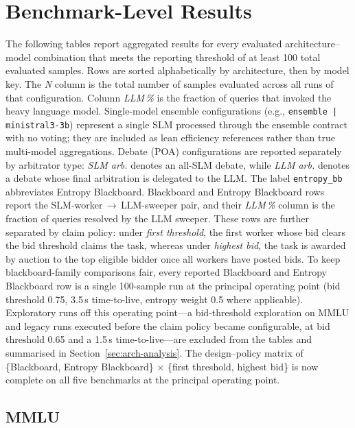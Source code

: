 \section{Benchmark-Level Results}
\label{sec:benchmark-results}

The following tables report aggregated results for every evaluated architecture--model combination that meets the reporting threshold of at least 100 total evaluated samples. Rows are sorted alphabetically by architecture, then by model key. The \emph{N} column is the total number of samples evaluated across all runs of that configuration. Column \emph{LLM\,\%} is the fraction of queries that invoked the heavy language model. Single-model ensemble configurations (e.g., \texttt{ensemble\,|\,ministral3-3b}) represent a single SLM processed through the ensemble contract with no voting; they are included as lean efficiency references rather than true multi-model aggregations. Debate (POA) configurations are reported separately by arbitrator type: \emph{SLM arb.} denotes an all-SLM debate, while \emph{LLM arb.} denotes a debate whose final arbitration is delegated to the LLM. The label \texttt{entropy\_bb} abbreviates Entropy Blackboard. Blackboard and Entropy Blackboard rows report the SLM-worker\,$\rightarrow$\,LLM-sweeper pair, and their \emph{LLM\,\%} column is the fraction of queries resolved by the LLM sweeper. These rows are further separated by claim policy: under \emph{first threshold}, the first worker whose bid clears the bid threshold claims the task, whereas under \emph{highest bid}, the task is awarded by auction to the top eligible bidder once all workers have posted bids. To keep blackboard-family comparisons fair, every reported Blackboard and Entropy Blackboard row is a single 100-sample run at the principal operating point (bid threshold 0.75, 3.5\,s time-to-live, entropy weight 0.5 where applicable). Exploratory runs off this operating point---a bid-threshold exploration on MMLU and legacy runs executed before the claim policy became configurable, at bid threshold 0.65 and a 1.5\,s time-to-live---are excluded from the tables and summarised in Section~\ref{sec:arch-analysis}. The design--policy matrix of \{Blackboard, Entropy Blackboard\} $\times$ \{first threshold, highest bid\} is now complete on all five benchmarks at the principal operating point.

\subsection{MMLU}

